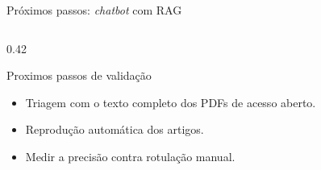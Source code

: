 \documentclass[aspectratio=169, 10pt]{beamer}
\begin{document}
\begin{frame}[t]{Próximos passos: \emph{chatbot} com RAG}
\begin{columns}[T,onlytextwidth]
\begin{column}{0.42\textwidth}
      \begin{exampleblock}{Proximos passos de validação}
        \scriptsize
        \begin{itemize}\setlength{\itemsep}{1pt}
          \item Triagem com o texto completo dos PDFs de acesso aberto.
          \item Reprodução automática dos artigos.
          \item Medir a precisão contra rotulação manual.
        \end{itemize}
      \end{exampleblock}
    \end{column}
  \end{columns}
\end{frame}

\end{document}
